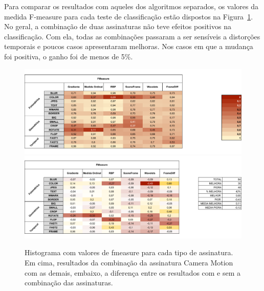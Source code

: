 Para comparar os resultados com aqueles dos algoritmos separados, os valores da medida F-measure para cada teste de classificação estão dispostos na Figura~\ref{fig:compacao-metodos}. No geral, a combinação de duas assinaturas não teve efeitos positivos na classificação. Com ela, todas as combinações passaram a ser sensíveis a distorções temporais e poucos casos apresentaram melhoras. Nos casos em que a mudança foi positiva, o ganho foi de menos de 5\%. 

\begin{figure}
	\caption{Histograma com valores de fmeasure para cada tipo de assinatura. Em cima, resultados da combinação da assinatura Camera Motion com as demais, embaixo, a diferença entre os resultados com e sem a combinação das assinaturas.}
	\label{fig:compacao-metodos}
	\includegraphics[width=\textwidth]{dados/figuras/experimentos/after_fmeasure.pdf}
	\includegraphics[width=\textwidth]{dados/figuras/experimentos/result_fmeasure.pdf}
\end{figure}




